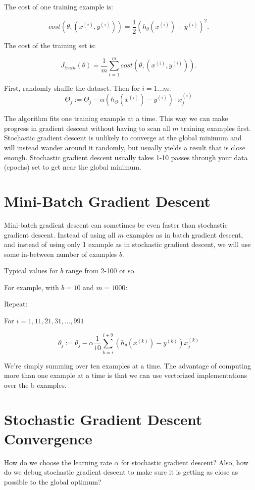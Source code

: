 \documentclass[a4paper,11pt]{report}
\begin{document}
The cost of one training example is:

$$cost(\theta,(x^{(i)}, y^{(i)})) = \dfrac{1}{2}(h_{\theta}(x^{(i)}) - y^{(i)})^2.$$

The cost of the training set is:

$$J_{train}(\theta) = \dfrac{1}{m} \displaystyle \sum_{i=1}^m cost(\theta, (x^{(i)}, y^{(i)})).$$

First, randomly shuffle the dataset. Then for $i = 1\dots m$:
$$\Theta_j := \Theta_j - \alpha (h_{\Theta}(x^{(i)}) - y^{(i)}) \cdot x^{(i)}_j$$

The algorithm fits one training example at a time. This way we can make progress in gradient descent without having to scan all $m$ training examples first. Stochastic gradient descent is unlikely to converge at the global minimum and will instead wander around it randomly, but usually yields a result that is close enough. Stochastic gradient descent usually takes 1-10 passes through your data (epochs) set to get near the global minimum.

\section*{Mini-Batch Gradient Descent}

Mini-batch gradient descent can sometimes be even faster than stochastic gradient descent. Instead of using all $m$ examples as in batch gradient descent, and instead of using only 1 example as in stochastic gradient descent, we will use some in-between number of examples $b$.

Typical values for $b$ range from 2-100 or so.

For example, with $b=10$ and $m=1000$:

Repeat:

For $i = 1,11,21,31,\dots,991$

$$\theta_j := \theta_j - \alpha \dfrac{1}{10} \displaystyle \sum_{k=i}^{i+9} (h_\theta(x^{(k)}) - y^{(k)})x_j^{(k)}$$

We're simply summing over ten examples at a time. The advantage of computing more than one example at a time is that we can use vectorized implementations over the b examples.

\section*{Stochastic Gradient Descent Convergence}

How do we choose the learning rate $\alpha$ for stochastic gradient descent? Also, how do we debug stochastic gradient descent to make sure it is getting as close as possible to the global optimum?
\end{document}
